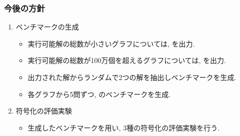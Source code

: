 \documentclass[dvipdfmx,11pt]{beamer}
\begin{document}

\begin{frame}\frametitle{今後の方針}

  \begin{enumerate}
    \item ベンチマークの生成 
    \begin{itemize}
      \item 実行可能解の総数が小さいグラフについては, を出力.
      \item 実行可能解の総数が100万個を超えるグラフについては, を出力.
      \item 出力された解からランダムで2つの解を抽出しベンチマークを生成.
      \item 各グラフから5問ずつ, のベンチマークを生成.
    \end{itemize}

    \item 符号化の評価実験
    \begin{itemize}
      \item 生成したベンチマークを用い, 3種の符号化の評価実験を行う.
    \end{itemize}
  \end{enumerate}
  

\end{frame}

\end{document}
